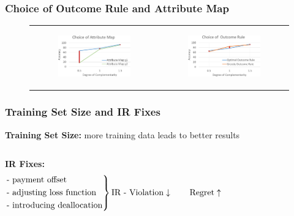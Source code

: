\documentclass{beamer}
\begin{document}
\begin{frame}
	\frametitle{Choice of Outcome Rule and Attribute Map}
	\begin{figure}[!ht]
		\begin{tabular}{c c}
			\begin{subfigure}{0.5\textwidth}
				\begin{center}
					\includegraphics[width=55mm]{res/choiceAttributeMap-cropped.pdf}
				\end{center}
			\end{subfigure} &
			\begin{subfigure}{0.5\textwidth}
				\includegraphics[width=55mm]{res/choiceOutcomeRule-cropped.pdf}
			\end{subfigure}
		\end{tabular}
	\end{figure}
\end{frame}

\begin{frame}
	\frametitle{Training Set Size and IR Fixes}
	\textbf{Training Set Size:} more training data leads to better results

	\bigskip \bigskip \bigskip
	\begin{columns}[c]
		\textbf{IR Fixes:}
	\begin{equation*}
	\begin{rcases}
	\text{- payment offset} \\
	\text{- adjusting loss function} \\
	\text{- introducing deallocation}
	\end{rcases}\text{IR - Violation} \downarrow  \qquad \text{Regret} \uparrow
	\end{equation*}
	\end{columns}
\end{frame}
\end{document}
